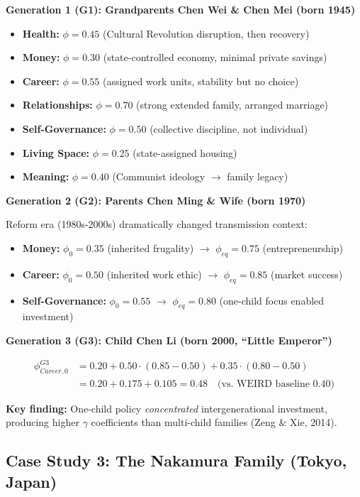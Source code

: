 \textbf{Generation 1 (G1): Grandparents Chen Wei \& Chen Mei (born 1945)}
\begin{itemize}[nosep]
\item \textbf{Health:} $\phi = 0.45$ (Cultural Revolution disruption, then recovery)
\item \textbf{Money:} $\phi = 0.30$ (state-controlled economy, minimal private savings)
\item \textbf{Career:} $\phi = 0.55$ (assigned work units, stability but no choice)
\item \textbf{Relationships:} $\phi = 0.70$ (strong extended family, arranged marriage)
\item \textbf{Self-Governance:} $\phi = 0.50$ (collective discipline, not individual)
\item \textbf{Living Space:} $\phi = 0.25$ (state-assigned housing)
\item \textbf{Meaning:} $\phi = 0.40$ (Communist ideology $\rightarrow$ family legacy)
\end{itemize}

\textbf{Generation 2 (G2): Parents Chen Ming \& Wife (born 1970)}

Reform era (1980s-2000s) dramatically changed transmission context:
\begin{itemize}[nosep]
\item \textbf{Money:} $\phi_0 = 0.35$ (inherited frugality) $\rightarrow$ $\phi_{eq} = 0.75$ (entrepreneurship)
\item \textbf{Career:} $\phi_0 = 0.50$ (inherited work ethic) $\rightarrow$ $\phi_{eq} = 0.85$ (market success)
\item \textbf{Self-Governance:} $\phi_0 = 0.55$ $\rightarrow$ $\phi_{eq} = 0.80$ (one-child focus enabled investment)
\end{itemize}

\textbf{Generation 3 (G3): Child Chen Li (born 2000, ``Little Emperor'')}

\begin{align}
\phi^{G3}_{Career,0} &= 0.20 + 0.50 \cdot (0.85 - 0.50) + 0.35 \cdot (0.80 - 0.50) \\
&= 0.20 + 0.175 + 0.105 = 0.48 \quad \text{(vs. WEIRD baseline 0.40)}
\end{align}

\textbf{Key finding:} One-child policy \textit{concentrated} intergenerational investment, producing
higher $\gamma$ coefficients than multi-child families (Zeng \& Xie, 2014).

\subsection{Case Study 3: The Nakamura Family (Tokyo, Japan)}


